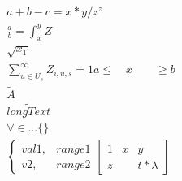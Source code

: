 \documentclass{article}
\begin{document}
    \begin{align}
        a + b - c = x * y / z ^z\\
        \frac{a}{b} = \int_x^y Z\\
        \sqrt{x_1}\\
        \sum_{u \in U_{s}}^{\infty} Z_{i,u,s} = 1

        a \leq \quad x \qquad \geq b\\
        
        \tilde{A}\\

        \widetilde{long Text}\\
        
        \forall \in \dots \{ \}\\

        \begin{cases}
            val1,  & range1\\
            v2,    & range2
        \end{cases}





        \left[
        \begin{matrix}
            1 & x & y\\
            z & & t*\lambda
        \end{matrix}    
        \right]


\end{align}
\end{document}
